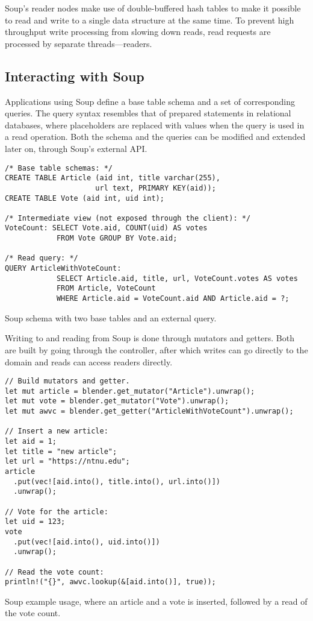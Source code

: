 Soup's reader nodes make use of double-buffered hash tables to make it possible
to read and write to a single data structure at the same time. To prevent high
throughput write processing from slowing down reads, read requests are processed
by separate threads---readers.

\subsection{Interacting with Soup}

Applications using Soup define a base table schema and a set of corresponding
queries. The query syntax resembles that of prepared statements in relational
databases, where placeholders are replaced with values when the query is used in
a read operation. Both the schema and the queries can be modified and extended
later on, through Soup's external API.\@

\begin{listing}[H]
  \begin{verbatim}
/* Base table schemas: */
CREATE TABLE Article (aid int, title varchar(255),
                     url text, PRIMARY KEY(aid));
CREATE TABLE Vote (aid int, uid int);

/* Intermediate view (not exposed through the client): */
VoteCount: SELECT Vote.aid, COUNT(uid) AS votes
            FROM Vote GROUP BY Vote.aid;

/* Read query: */
QUERY ArticleWithVoteCount:
            SELECT Article.aid, title, url, VoteCount.votes AS votes
            FROM Article, VoteCount
            WHERE Article.aid = VoteCount.aid AND Article.aid = ?;
  \end{verbatim}
  \caption{Soup schema with two base tables and an external query.}\label{lst:soup-schema}
\end{listing}

Writing to and reading from Soup is done through mutators and getters. Both are
built by going through the controller, after which writes can go directly to the
domain and reads can access readers directly.

\begin{listing}[H]
  \begin{verbatim}
// Build mutators and getter.
let mut article = blender.get_mutator("Article").unwrap();
let mut vote = blender.get_mutator("Vote").unwrap();
let mut awvc = blender.get_getter("ArticleWithVoteCount").unwrap();

// Insert a new article:
let aid = 1;
let title = "new article";
let url = "https://ntnu.edu";
article
  .put(vec![aid.into(), title.into(), url.into()])
  .unwrap();

// Vote for the article:
let uid = 123;
vote
  .put(vec![aid.into(), uid.into()])
  .unwrap();

// Read the vote count:
println!("{}", awvc.lookup(&[aid.into()], true));
  \end{verbatim}

  \caption{Soup example usage, where an article and a vote is inserted,
  followed by a read of the vote count.}\label{lst:soup-api}
\end{listing}

